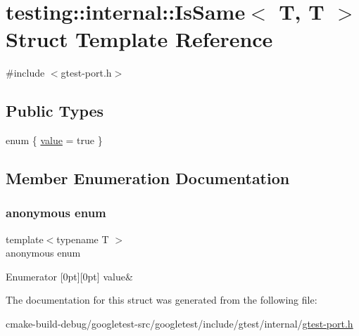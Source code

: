 \hypertarget{structtesting_1_1internal_1_1IsSame_3_01T_00_01T_01_4}{}\section{testing\+::internal\+::Is\+Same$<$ T, T $>$ Struct Template Reference}
\label{structtesting_1_1internal_1_1IsSame_3_01T_00_01T_01_4}


{\ttfamily \#include $<$gtest-\/port.\+h$>$}

\subsection*{Public Types}
\begin{DoxyCompactItemize}
\item 
enum \{ \mbox{\hyperlink{structtesting_1_1internal_1_1IsSame_3_01T_00_01T_01_4_ac0d986abcf98ce8eb16fbb9da6d1e6c4a0bb1c61b491e4e13216a3f9e9cd24c69}{value}} = true
 \}
\end{DoxyCompactItemize}


\subsection{Member Enumeration Documentation}
\mbox{\label{structtesting_1_1internal_1_1IsSame_3_01T_00_01T_01_4_ac0d986abcf98ce8eb16fbb9da6d1e6c4}} 
\subsubsection{\texorpdfstring{anonymous enum}{anonymous enum}}
{\footnotesize\ttfamily template$<$typename T $>$ \\
anonymous enum}

\begin{DoxyEnumFields}{Enumerator}
[0pt][0pt]{}\mbox{\label{structtesting_1_1internal_1_1IsSame_3_01T_00_01T_01_4_ac0d986abcf98ce8eb16fbb9da6d1e6c4a0bb1c61b491e4e13216a3f9e9cd24c69}} 
value&\\
\hline

\end{DoxyEnumFields}


The documentation for this struct was generated from the following file\+:\begin{DoxyCompactItemize}
\item 
cmake-\/build-\/debug/googletest-\/src/googletest/include/gtest/internal/\mbox{\hyperlink{gtest-port_8h}{gtest-\/port.\+h}}\end{DoxyCompactItemize}
